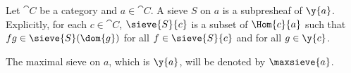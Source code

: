 \begin{definition}[Sieve]
Let $\cat{C}$ be a category 
and $a \in \cat{C}$.
A sieve $S$ on $a$ is a subpresheaf of $\y{a}$.
Explicitly, for each $c\in \cat{C}$, 
$\sieve{S}{c}$ is a subset of $\Hom{c}{a}$
such that $fg \in \sieve{S}(\dom{g})$ 
for all $f \in \sieve{S}{c}$
and for all $g \in \y{c}$.

The maximal sieve on $a$, 
which is $\y{a}$, 
will be denoted by $\maxsieve{a}$.
\end{definition}